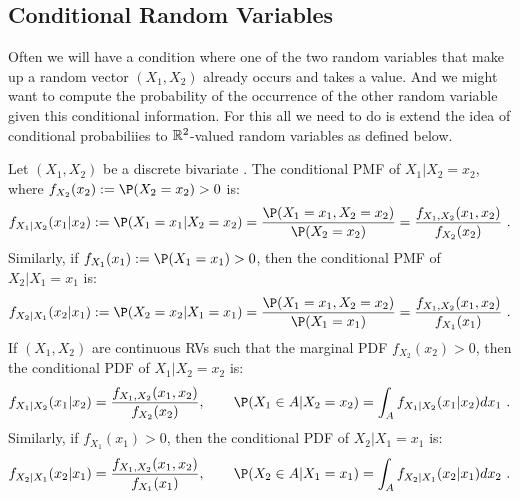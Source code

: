 \subsection{Conditional Random Variables}\label{S:CondRVs}

Often we will have a condition where one of the two random variables that make up a random vector $(X_1,X_2)$ already occurs and takes a value. 
And we might want to compute the probability of the occurrence of the other random variable given this conditional information.
For this all we need to do is extend the idea of conditional probabiliies to $\mathbb{R}^2$-valued random variables as defined below.

\begin{definition}
Let $(X_1,X_2)$ be a discrete bivariate \rv.  The conditional PMF of $X_1|X_2=x_2$, where $f_{X_2}(x_2) := \P(X_2=x_2) > 0$ is:
\[
f_{X_1|X_2}(x_1 | x_2) := \P(X_1=x_1 | X_2=x_2) = \frac{\P(X_1=x_1,X_2=x_2)}{\P(X_2=x_2)} = \frac{f_{X_1,X_2}(x_1,x_2)}{f_{X_2}(x_2)} \ .
\]
Similarly, if $f_{X_1}(x_1) := \P(X_1=x_1) >0$, then the conditional PMF of $X_2|X_1=x_1$ is:
\[
f_{X_2|X_1}(x_2|x_1) := \P(X_2=x_2 | X_1=x_1) = \frac{\P(X_1=x_1,X_2=x_2)}{\P(X_1=x_1)} = \frac{f_{X_1,X_2}(x_1,x_2)}{f_{X_1}(x_1)} \ .
\]
If $(X_1,X_2)$ are continuous RVs such that the marginal PDF $f_{X_2}(x_2)>0$, then the conditional PDF of $X_1|X_2=x_2$ is:
\[
f_{X_1|X_2}(x_1|x_2) = \frac{f_{X_1,X_2}(x_1,x_2)}{f_{X_2}(x_2)}, \qquad \P(X_1 \in A| X_2=x_2) = \int_A f_{X_1|X_2}(x_1|x_2) dx_1 \ .
\]
Similarly, if $f_{X_1}(x_1)>0$, then the conditional PDF of $X_2|X_1=x_1$ is:
\[
f_{X_2|X_1}(x_2|x_1) = \frac{f_{X_1,X_2}(x_1,x_2)}{f_{X_1}(x_1)}, \qquad \P(X_2 \in A| X_1=x_1) = \int_A f_{X_2|X_1}(x_2|x_1) dx_2 \ .
\]
\end{definition}

